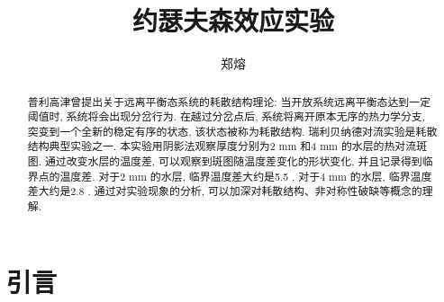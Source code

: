 \documentclass[font=default]{mpltx}
\makeatletter
\newcommand{\note}[1]{{\color{gray}#1}}
\newcommand*\file[1]{\textbf{\texttt{#1}}}
\newcommand\releasedate{%
    \href{https://github.com/CastleStar14654/PKUMpLtX/releases/tag/\mpltx@fileversion}%
        {\mpltx@filedate, \mpltx@fileversion}}
\makeatother
\begin{document}
\title{约瑟夫森效应实验} %
\author{郑熔} %
\date{}
\begin{abstract}
  普利高津曾提出关于远离平衡态系统的耗散结构理论: 当开放系统远离平衡态达到一定阈值时, 系统将会出现分岔行为. 在越过分岔点后, 系统将离开原本无序的热力学分支, 突变到一个全新的稳定有序的状态,
  该状态被称为耗散结构.
  瑞利贝纳德对流实验是耗散结构典型实验之一.
  本实验用阴影法观察厚度分别为2 mm 和4 mm 的水层的热对流斑图. 通过改变水层的温度差, 可以观察到斑图随温度差变化的形状变化, 并且记录得到临界点的温度差. 对于2 mm 的水层, 
  临界温度差大约是5.5 \circ , 对于4 mm 的水层, 临界温度差大约是2.8 \circ. 通过对实验现象的分析, 可以加深对耗散结构、非对称性破缺等概念的理解.
 
\end{abstract}

\maketitle

\section{引言}
\end{document}
